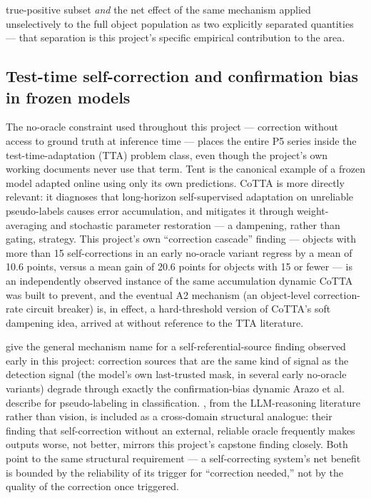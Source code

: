 \documentclass[11pt]{article}
\begin{document}
true-positive subset \emph{and} the net effect of the same mechanism applied unselectively to the full object population as two explicitly separated quantities — that separation is this project's specific empirical contribution to the area.

\subsection{Test-time self-correction and confirmation bias in frozen models}

The no-oracle constraint used throughout this project — correction without access to ground truth at inference time — places the entire P5 series inside the test-time-adaptation (TTA) problem class, even though the project's own working documents never use that term. Tent \citep{wang2020tent} is the canonical example of a frozen model adapted online using only its own predictions. CoTTA \citep{wang2022cotta} is more directly relevant: it diagnoses that long-horizon self-supervised adaptation on unreliable pseudo-labels causes error accumulation, and mitigates it through weight-averaging and stochastic parameter restoration — a dampening, rather than gating, strategy. This project's own ``correction cascade'' finding — objects with more than 15 self-corrections in an early no-oracle variant regress by a mean of 10.6 points, versus a mean gain of 20.6 points for objects with 15 or fewer — is an independently observed instance of the same accumulation dynamic CoTTA was built to prevent, and the eventual A2 mechanism (an object-level correction-rate circuit breaker) is, in effect, a hard-threshold version of CoTTA's soft dampening idea, arrived at without reference to the TTA literature.

\citet{arazo2020} give the general mechanism name for a self-referential-source finding observed early in this project: correction sources that are the same kind of signal as the detection signal (the model's own last-trusted mask, in several early no-oracle variants) degrade through exactly the confirmation-bias dynamic Arazo et al. describe for pseudo-labeling in classification. \citet{huang2023}, from the LLM-reasoning literature rather than vision, is included as a cross-domain structural analogue: their finding that self-correction without an external, reliable oracle frequently makes outputs worse, not better, mirrors this project's capstone finding closely. Both point to the same structural requirement — a self-correcting system's net benefit is bounded by the reliability of its trigger for ``correction needed,'' not by the quality of the correction once triggered.
\end{document}
